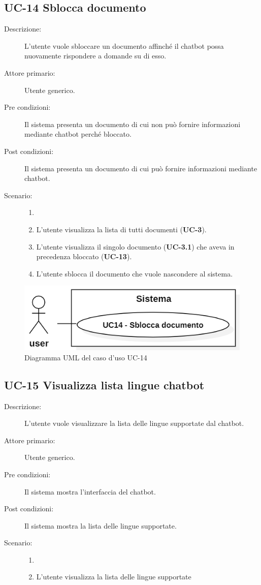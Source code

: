 \subsection{UC-14 Sblocca documento}
\begin{description}
    \item[Descrizione:] L'utente vuole sbloccare un documento affinché il chatbot possa nuovamente rispondere a domande su di esso.
    \item[Attore primario:] Utente generico.
    \item[Pre condizioni:] Il sistema presenta un documento di cui non può fornire informazioni mediante chatbot perché bloccato.
    \item[Post condizioni:] Il sistema presenta un documento di cui può fornire informazioni mediante chatbot.
    \newpage
    \item[Scenario:]
    \begin{enumerate}
        \item[]
        \item L’utente visualizza la lista di tutti documenti (\textbf{UC-3}).
        \item L'utente visualizza il singolo documento  (\textbf{UC-3.1}) che aveva in precedenza bloccato (\textbf{UC-13}).
        \item L'utente sblocca il documento che vuole nascondere al sistema.
    \end{enumerate}
\end{description}

\begin{figure}[H]
    \centering
    \includegraphics[width=0.8\linewidth]{UC14.PNG}
    \caption{Diagramma UML del caso d'uso UC-14}
\end{figure}

\subsection{UC-15 Visualizza lista lingue chatbot}
\begin{description}
    \item[Descrizione:] L'utente vuole visualizzare la lista delle lingue supportate dal chatbot.
    \item[Attore primario:] Utente generico.
    \item[Pre condizioni:] Il sistema mostra l'interfaccia del chatbot.
    \item[Post condizioni:] Il sistema mostra la lista delle lingue supportate.
    \item[Scenario:]
    \begin{enumerate}
        \item[]
        \item L'utente visualizza la lista delle lingue supportate
    \end{enumerate}
\end{description}


